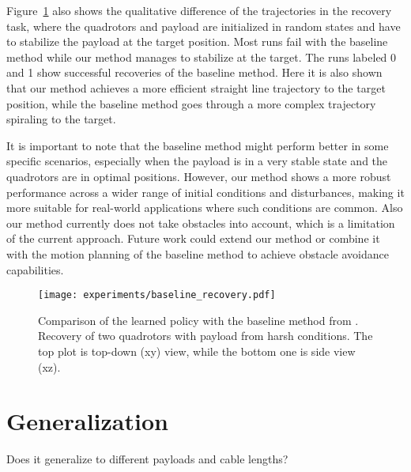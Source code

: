Figure~\ref{fig:baseline_recovery} also shows the qualitative difference of the trajectories in the recovery task, where the quadrotors and payload are initialized in random states and have to stabilize the payload at the target position. Most runs fail with the baseline method while our method manages to stabilize at the target. The runs labeled 0 and 1 show successful recoveries of the baseline method. Here it is also shown that our method achieves a more efficient straight line trajectory to the target position, while the baseline method goes through a more complex trajectory spiraling to the target.

It is important to note that the baseline method might perform better in some specific scenarios, especially when the payload is in a very stable state and the quadrotors are in optimal positions. However, our method shows a more robust performance across a wider range of initial conditions and disturbances, making it more suitable for real-world applications where such conditions are common. Also our method currently does not take obstacles into account, which is a limitation of the current approach. Future work could extend our method or combine it with the motion planning of the baseline method to achieve obstacle avoidance capabilities. 

\begin{figure}[H]
    \centering
    
    \texttt{[image: experiments/baseline\_recovery.pdf]}
    \caption[Baseline vs learned two quad recovery]{Comparison of the learned policy with the baseline method from \autocite{Wahba2024}. Recovery of two quadrotors with payload from harsh conditions. The top plot is top-down  (xy) view, while the bottom one is side view (xz).}
    \label{fig:baseline_recovery}
\end{figure}


\section{Generalization}
Does it generalize to different payloads and cable lengths?

